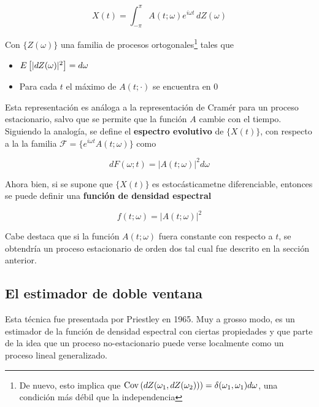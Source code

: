 \begin{equation*}
X(t) = \int_{-\pi}^{\pi} A(t ; \omega) e^{i\omega t} \, d Z(\omega)
\end{equation*}

Con $\{ Z(\omega) \}$ una familia de procesos ortogonales\footnote{De nuevo, esto implica que
$\mathrm{Cov}\left( dZ(\omega_1,dZ(\omega_2)) \right) = \delta(\omega_1,\omega_1) d\omega$, una condici\'on m\'as
d\'ebil que la independencia} tales que

\begin{itemize}
\item $E \left[\lvert  dZ(\omega) \rvert^{2} \right] = d\omega$
\item Para cada $t$ el m\'aximo de $A(t;\cdot)$ se encuentra en 0
\end{itemize}

Esta representaci\'on es an\'aloga a la representaci\'on de Cram\'er para un proceso
estacionario, salvo que se permite que la funci\'on $A$ cambie con el tiempo.
Siguiendo la analog\'ia, se define 
el \textbf{espectro evolutivo} de $\{X(t)\}$, con respecto a la la familia
$\mathcal{F} = \{ e^{i\omega t} A(t; \omega) \}$
 como
 
\begin{equation*}
d F(\omega;t) = \lvert A(t;\omega) \lvert^{2} d\omega
\end{equation*}

Ahora bien, si se supone que $\{X(t)\}$ es estoc\'asticametne diferenciable, entonces
se puede definir una \textbf{funci\'on de densidad espectral}

\begin{equation*}
f(t;\omega) = \lvert A(t;\omega) \lvert^{2}
\end{equation*}

Cabe destaca que si la funci\'on $A(t;\omega)$ fuera constante con respecto a $t$, se obtendr\'ia
un proceso estacionario de orden dos tal cual fue descrito en la secci\'on anterior.


\subsection{El estimador de doble ventana}

Esta t\'ecnica fue presentada por Priestley en 1965. Muy a grosso modo, es un estimador de la
funci\'on de densidad espectral con ciertas propiedades y que parte de la idea que un proceso
no-estacionario puede verse localmente como un proceso lineal generalizado.

